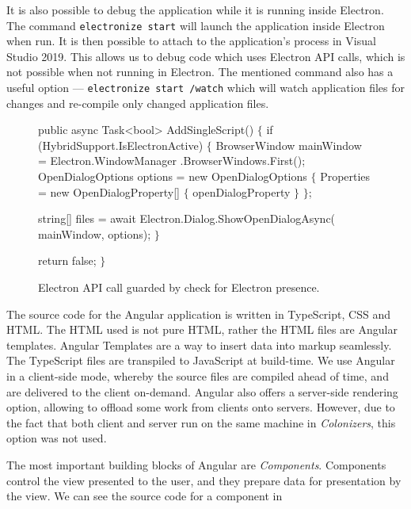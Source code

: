 It is also possible to debug the application while it is running inside Electron.
The command \texttt{electronize start} will launch the application
inside Electron when run. It is then possible to attach to the application's
process in Visual Studio 2019. This allows us to debug code which uses Electron
API calls, which is not possible when not running in Electron. The mentioned
command also has a useful option --- \texttt{electronize start /watch}
which will watch application files
for changes and re-compile only changed application files.


\begin{figure}[hb]
\begin{code}[commandchars=\\\{\},codes={\catcode`\$=3\catcode`\^=7\catcode`\_=8}]
public async Task<bool> AddSingleScript()
$\{$
    if (HybridSupport.IsElectronActive)
    $\{$
        BrowserWindow mainWindow = Electron.WindowManager
            .BrowserWindows.First();
        OpenDialogOptions options = new OpenDialogOptions
        $\{$
            Properties = new OpenDialogProperty[] $\{$
                    openDialogProperty
                $\}$
        $\}$;

        string[] files = await Electron.Dialog.ShowOpenDialogAsync(
            mainWindow, options);
    $\}$

    return false;
$\}$
\end{code}
\caption{Electron API call guarded by check for Electron presence.}\label{dd:electronguard}
\end{figure}

The source code for the Angular application is written in TypeScript, CSS and HTML.
The HTML used is not pure HTML, rather the HTML files are Angular templates.
Angular Templates are a way to insert data into markup seamlessly.
The TypeScript files are transpiled to JavaScript at build-time.
We use Angular in a client-side mode, whereby the source files are compiled
ahead of time, and are delivered to the client on-demand. Angular also
offers a server-side rendering option, allowing to offload some work
from clients onto servers. However, due to the fact that both client and server
run on the same machine in \emph{Colonizers}, this option was not used.

The most important building blocks of Angular are \emph{Components}.
Components control the view presented to the user, and they prepare
data for presentation by the view. We can see the source code for a component
in 

